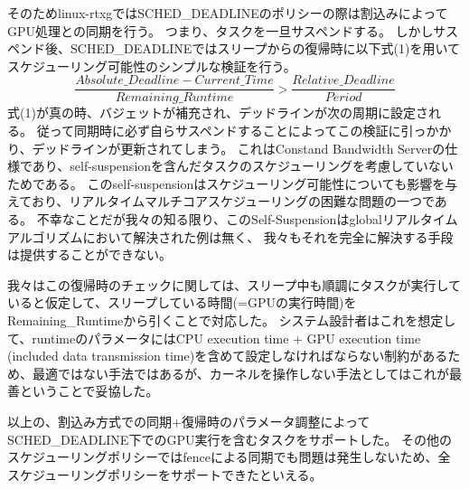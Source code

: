 そのためlinux-rtxgではSCHED\_DEADLINEのポリシーの際は割込みによってGPU処理との同期を行う。
つまり、タスクを一旦サスペンドする。
しかしサスペンド後、SCHED\_DEADLINEではスリープからの復帰時に以下式(1)を用いてスケジューリング可能性のシンプルな検証を行う。
{\scriptsize
\begin{equation}
\frac{Absolute\_Deadline - Current\_Time}{Remaining\_Runtime} > \frac{Relative\_Deadline}{Period}
\end{equation}
}
式(1)が真の時、バジェットが補充され、デッドラインが次の周期に設定される。
従って同期時に必ず自らサスペンドすることによってこの検証に引っかかり、デッドラインが更新されてしまう。
これはConstand Bandwidth Serverの仕様であり、self-suspensionを含んだタスクのスケジューリングを考慮していないためである。
このself-suspensionはスケジューリング可能性についても影響を与えており、リアルタイムマルチコアスケジューリングの困難な問題の一つである。
不幸なことだが我々の知る限り、このSelf-Suspensionはglobalリアルタイムアルゴリズムにおいて解決された例は無く、
我々もそれを完全に解決する手段は提供することができない。

我々はこの復帰時のチェックに関しては、スリープ中も順調にタスクが実行していると仮定して、スリープしている時間(=GPUの実行時間)をRemaining\_Runtimeから引くことで対応した。
システム設計者はこれを想定して、runtimeのパラメータにはCPU execution time + GPU execution time (included data transmission time)を含めて設定しなければならない制約があるため、最適ではない手法ではあるが、カーネルを操作しない手法としてはこれが最善ということで妥協した。

以上の、割込み方式での同期+復帰時のパラメータ調整によってSCHED\_DEADLINE下でのGPU実行を含むタスクをサポートした。
その他のスケジューリングポリシーではfenceによる同期でも問題は発生しないため、全スケジューリングポリシーをサポートできたといえる。

